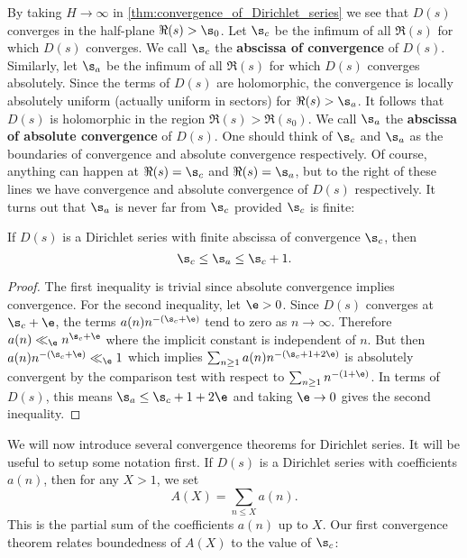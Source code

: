     By taking $H \to \infty$ in \cref{thm:convergence_of_Dirichlet_series} we see that $D(s)$ converges in the half-plane $\Re(s) > \s_{0}$. Let $\s_{c}$ be the infimum of all $\Re(s)$ for which $D(s)$ converges. We call $\s_{c}$ the \textbf{abscissa of convergence} of $D(s)$. Similarly, let $\s_{a}$ be the infimum of all $\Re(s)$ for which $D(s)$ converges absolutely. Since the terms of $D(s)$ are holomorphic, the convergence is locally absolutely uniform (actually uniform in sectors) for $\Re(s) > \s_{a}$. It follows that $D(s)$ is holomorphic in the region $\Re(s) > \Re(s_{0})$.  We call $\s_{a}$ the \textbf{abscissa of absolute convergence} of $D(s)$. One should think of $\s_{c}$ and $\s_{a}$ as the boundaries of convergence and absolute convergence respectively. Of course, anything can happen at $\Re(s) = \s_{c}$ and $\Re(s) = \s_{a}$, but to the right of these lines we have convergence and absolute convergence of $D(s)$ respectively. It turns out that $\s_{a}$ is never far from $\s_{c}$ provided $\s_{c}$ is finite:

    \begin{theorem}
      If $D(s)$ is a Dirichlet series with finite abscissa of convergence $\s_{c}$, then
      \[
        \s_{c} \le \s_{a} \le \s_{c}+1.
      \]
    \end{theorem}
    \begin{proof}
      The first inequality is trivial since absolute convergence implies convergence. For the second inequality, let $\e > 0$. Since $D(s)$ converges at $\s_{c}+\e$, the terms $a(n)n^{-(\s_{c}+\e)}$ tend to zero as $n \to \infty$. Therefore $a(n) \ll_{\e} n^{\s_{c}+\e}$ where the implicit constant is independent of $n$. But then $a(n)n^{-(\s_{c}+\e)} \ll_{\e} 1$ which implies $\sum_{n \ge 1}a(n)n^{-(\s_{c}+1+2\e)}$ is absolutely convergent by the comparison test with respect to $\sum_{n \ge 1}n^{-(1+\e)}$. In terms of $D(s)$, this means $\s_{a} \le \s_{c}+1+2\e$ and taking $\e \to 0$ gives the second inequality.
    \end{proof}

    We will now introduce several convergence theorems for Dirichlet series. It will be useful to setup some notation first. If $D(s)$ is a Dirichlet series with coefficients $a(n)$, then for any $X > 1$, we set
    \[
      A(X) = \sum_{n \le X}a(n).
    \]
    This is the partial sum of the coefficients $a(n)$ up to $X$. Our first convergence theorem relates boundedness of $A(X)$ to the value of $\s_{c}$: 
    
